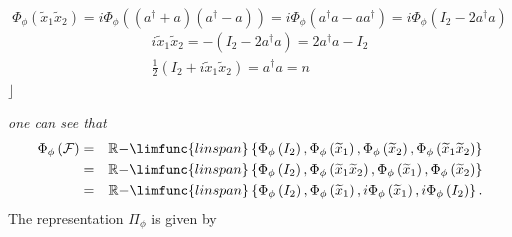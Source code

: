 \documentclass[aps,preprint]{revtex4}
\begin{document}
\begin{equation}
\Phi _{\phi }\left( \widetilde{x}_{1}\widetilde{x}_{2}\right) =i\Phi _{\phi
}\left( \left( a^{\dagger }+a\right) \left( a^{\dagger }-a\right) \right)
=i\Phi _{\phi }\left( a^{\dagger }a-aa^{\dagger }\right) =i\Phi _{\phi
}\left( I_{2}-2a^{\dagger }a\right)
\end{equation}%
\begin{gather}
i\widetilde{x}_{1}\widetilde{x}_{2}=-\left( I_{2}-2a^{\dagger }a\right)
=2a^{\dagger }a-I_{2} \\
\frac{1}{2}\left( I_{2}+i\widetilde{x}_{1}\widetilde{x}_{2}\right)
=a^{\dagger }a=n
\end{gather}%
$\rfloor $

\emph{one can see that}%
\begin{eqnarray}
\Phi _{\phi }\left( \mathcal{F}\right) &=&\mathbb{R-}\limfunc{linspan}%
\left\{ \Phi _{\phi }\left( I_{2}\right) ,\Phi _{\phi }\left( \widetilde{x}%
_{1}\right) ,\Phi _{\phi }\left( \widetilde{x}_{2}\right) ,\Phi _{\phi
}\left( \widetilde{x}_{1}\widetilde{x}_{2}\right) \right\} \\
&=&\mathbb{R-}\limfunc{linspan}\left\{ \Phi _{\phi }\left( I_{2}\right)
,\Phi _{\phi }\left( \widetilde{x}_{1}\widetilde{x}_{2}\right) ,\Phi _{\phi
}\left( \widetilde{x}_{1}\right) ,\Phi _{\phi }\left( \widetilde{x}%
_{2}\right) \right\} \\
&=&\mathbb{R-}\limfunc{linspan}\left\{ \Phi _{\phi }\left( I_{2}\right)
,\Phi _{\phi }\left( \widetilde{x}_{1}\right) ,i\Phi _{\phi }\left( 
\widetilde{x}_{1}\right) ,i\Phi _{\phi }\left( I_{2}\right) \right\} .
\end{eqnarray}
The representation $\Pi _{\phi }$ is given by
\end{document}
